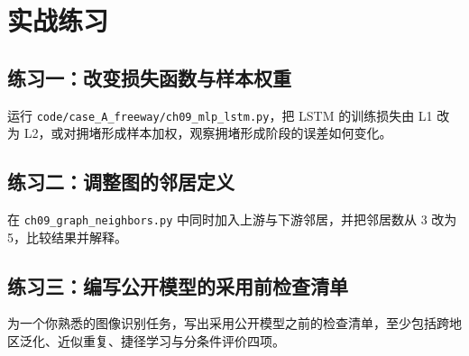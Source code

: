 \section{实战练习}

\subsection*{练习一：改变损失函数与样本权重}

运行 \texttt{code/case\_A\_freeway/ch09\_mlp\_lstm.py}，把 LSTM 的训练损失由 L1 改为 L2，或对拥堵形成样本加权，观察拥堵形成阶段的误差如何变化。

\subsection*{练习二：调整图的邻居定义}

在 \texttt{ch09\_graph\_neighbors.py} 中同时加入上游与下游邻居，并把邻居数从 3 改为 5，比较结果并解释。

\subsection*{练习三：编写公开模型的采用前检查清单}

为一个你熟悉的图像识别任务，写出采用公开模型之前的检查清单，至少包括跨地区泛化、近似重复、捷径学习与分条件评价四项。

